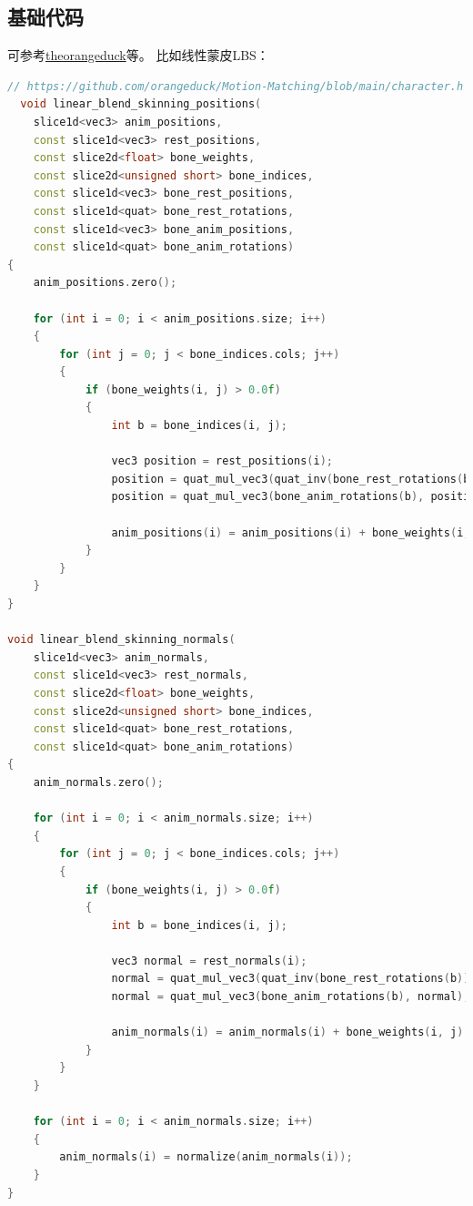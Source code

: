\documentclass[lang=cn,newtx,10pt,scheme=chinese]{elegantbook}
\begin{document}
\subsection{基础代码}
可参考\href{https://theorangeduck.com/page/all}{theorangeduck}等。
比如线性蒙皮LBS：
\begin{lstlisting}[language=C++]  
  // https://github.com/orangeduck/Motion-Matching/blob/main/character.h
  void linear_blend_skinning_positions(
    slice1d<vec3> anim_positions,
    const slice1d<vec3> rest_positions,
    const slice2d<float> bone_weights,
    const slice2d<unsigned short> bone_indices,
    const slice1d<vec3> bone_rest_positions,
    const slice1d<quat> bone_rest_rotations,
    const slice1d<vec3> bone_anim_positions,
    const slice1d<quat> bone_anim_rotations)
{
    anim_positions.zero();
    
    for (int i = 0; i < anim_positions.size; i++)
    {
        for (int j = 0; j < bone_indices.cols; j++)
        {
            if (bone_weights(i, j) > 0.0f)
            {
                int b = bone_indices(i, j);
                
                vec3 position = rest_positions(i);            
                position = quat_mul_vec3(quat_inv(bone_rest_rotations(b)), position - bone_rest_positions(b));
                position = quat_mul_vec3(bone_anim_rotations(b), position) + bone_anim_positions(b);
                
                anim_positions(i) = anim_positions(i) + bone_weights(i, j) * position;
            }
        } 
    }
}

void linear_blend_skinning_normals(
    slice1d<vec3> anim_normals,
    const slice1d<vec3> rest_normals,
    const slice2d<float> bone_weights,
    const slice2d<unsigned short> bone_indices,
    const slice1d<quat> bone_rest_rotations,
    const slice1d<quat> bone_anim_rotations)
{
    anim_normals.zero();
    
    for (int i = 0; i < anim_normals.size; i++)
    { 
        for (int j = 0; j < bone_indices.cols; j++)
        {
            if (bone_weights(i, j) > 0.0f)
            {
                int b = bone_indices(i, j);
                
                vec3 normal = rest_normals(i);
                normal = quat_mul_vec3(quat_inv(bone_rest_rotations(b)), normal);
                normal = quat_mul_vec3(bone_anim_rotations(b), normal);
                
                anim_normals(i) = anim_normals(i) + bone_weights(i, j) * normal;
            }
        }
    }
    
    for (int i = 0; i < anim_normals.size; i++)
    { 
        anim_normals(i) = normalize(anim_normals(i));
    }
}

\end{lstlisting}
\end{document}
